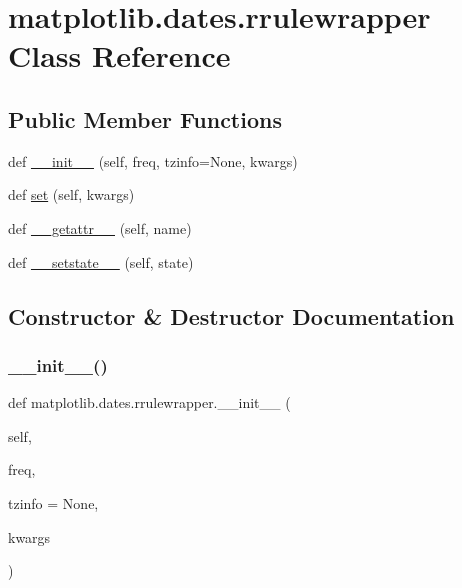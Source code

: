 \hypertarget{classmatplotlib_1_1dates_1_1rrulewrapper}{}\section{matplotlib.\+dates.\+rrulewrapper Class Reference}
\label{classmatplotlib_1_1dates_1_1rrulewrapper}
\subsection*{Public Member Functions}
\begin{DoxyCompactItemize}
\item 
def \hyperlink{classmatplotlib_1_1dates_1_1rrulewrapper_ab189010f98f7d1f087cf608de6b13108}{\+\_\+\+\_\+init\+\_\+\+\_\+} (self, freq, tzinfo=None, kwargs)
\item 
def \hyperlink{classmatplotlib_1_1dates_1_1rrulewrapper_a2ae3ea83522d38e521aca31ed999655d}{set} (self, kwargs)
\item 
def \hyperlink{classmatplotlib_1_1dates_1_1rrulewrapper_ad299ff9d30e0202a4661d9279b7bda76}{\+\_\+\+\_\+getattr\+\_\+\+\_\+} (self, name)
\item 
def \hyperlink{classmatplotlib_1_1dates_1_1rrulewrapper_a8e7eb697bfa4f782bfe046f8bb3d444c}{\+\_\+\+\_\+setstate\+\_\+\+\_\+} (self, state)
\end{DoxyCompactItemize}


\subsection{Constructor \& Destructor Documentation}
\mbox{\label{classmatplotlib_1_1dates_1_1rrulewrapper_ab189010f98f7d1f087cf608de6b13108}} 
\subsubsection{\texorpdfstring{\+\_\+\+\_\+init\+\_\+\+\_\+()}{\_\_init\_\_()}}
{\footnotesize\ttfamily def matplotlib.\+dates.\+rrulewrapper.\+\_\+\+\_\+init\+\_\+\+\_\+ (\begin{DoxyParamCaption}\item[{}]{self,  }\item[{}]{freq,  }\item[{}]{tzinfo = {\ttfamily None},  }\item[{}]{kwargs }\end{DoxyParamCaption})}




